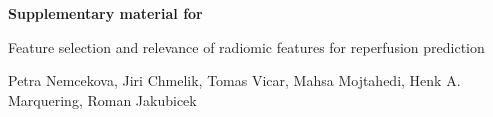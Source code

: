 \documentclass[a4paper,10pt]{article}
\begin{document}
\providecommand{\tablesdir}{.}

{\large\bfseries Supplementary material for\par}
\smallskip
{\large Feature selection and relevance of radiomic features for reperfusion prediction\par}
\smallskip
Petra Nemcekova, Jiri Chmelik, Tomas Vicar, Mahsa Mojtahedi, Henk A. Marquering, Roman Jakubicek
\bigskip





\end{document}
